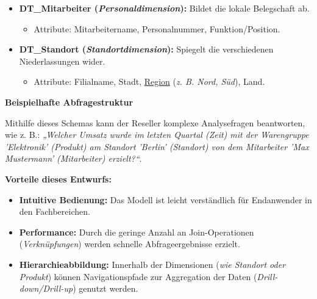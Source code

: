 \begin{enumerate}[label=\arabic*.), leftmargin=*]
\begin{itemize}
\begin{itemize}
        \end{itemize}
        \item \textbf{\acs{DT}\_Mitarbeiter (\textit{Personaldimension}):} Bildet die lokale Belegschaft ab. \cite{67}
        \begin{itemize}
            \item Attribute: Mitarbeitername, Personalnummer, Funktion/Position. \cite{67}\cite{70}
        \end{itemize}
        \item \textbf{\acs{DT}\_Standort (\textit{Standortdimension}):} Spiegelt die verschiedenen Niederlassungen wider. \cite{63}\cite{64}\cite{67}
        \begin{itemize}
            \item Attribute: Filialname, Stadt, \uline{Region} (\textit{\acs{z. B.} Nord, Süd}), Land. \cite{65}\cite{67}
        \end{itemize}
    \end{itemize}
\end{enumerate}
\textbf{Beispielhafte Abfragestruktur} \par Mithilfe dieses Schemas kann der Reseller komplexe Analysefragen beantworten, wie \acs{z. B.}: \textit{„Welcher Umsatz wurde im letzten Quartal (Zeit) mit der Warengruppe 'Elektronik' (Produkt) am Standort 'Berlin' (Standort) von dem Mitarbeiter 'Max Mustermann' (Mitarbeiter) erzielt?“}. \cite{58}\cite{59}\cite{63}\cite{64} \par \textbf{Vorteile dieses Entwurfs:} \cite{71}
\begin{itemize}
    \item \textbf{Intuitive Bedienung:} Das Modell ist leicht verständlich für Endanwender in den Fachbereichen. \cite{71}
    \item \textbf{Performance:} Durch die geringe Anzahl an Join-Operationen (\textit{Verknüpfungen}) werden schnelle Abfrageergebnisse erzielt. \cite{71}\cite{72}
    \item \textbf{Hierarchieabbildung:} Innerhalb der Dimensionen (\textit{wie Standort oder Produkt}) können Navigationspfade zur Aggregation der Daten (\textit{Drill-down/Drill-up}) genutzt werden. \cite{63}\cite{64}\cite{65}\cite{67}
\end{itemize}


